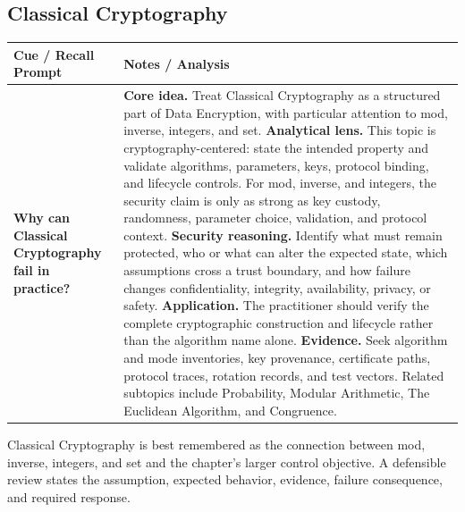 \documentclass[11pt]{article}
\newcommand{\CornellHeader}{%
\rowcolor{Navy}\color{white}\bfseries Cue / Recall Prompt & \color{white}\bfseries Notes / Analysis\\\hline}
\newcommand{\CornellRow}[2]{%
\cellcolor{CueGray}\RaggedRight\textbf{#1} & \RaggedRight #2\\\hline}
\begin{document}
\subsection*{Classical Cryptography}
\begin{longtable}{>{\RaggedRight\arraybackslash}p{}|>{\RaggedRight\arraybackslash}p{}}
\CornellHeader
\CornellRow{Why can Classical Cryptography fail in practice?}{\textbf{Core idea.} Treat Classical Cryptography as a structured part of Data Encryption, with particular attention to mod, inverse, integers, and set. \textbf{Analytical lens.} This topic is cryptography-centered: state the intended property and validate algorithms, parameters, keys, protocol binding, and lifecycle controls. For mod, inverse, and integers, the security claim is only as strong as key custody, randomness, parameter choice, validation, and protocol context. \textbf{Security reasoning.} Identify what must remain protected, who or what can alter the expected state, which assumptions cross a trust boundary, and how failure changes confidentiality, integrity, availability, privacy, or safety. \textbf{Application.} The practitioner should verify the complete cryptographic construction and lifecycle rather than the algorithm name alone. \textbf{Evidence.} Seek algorithm and mode inventories, key provenance, certificate paths, protocol traces, rotation records, and test vectors. Related subtopics include Probability, Modular Arithmetic, The Euclidean Algorithm, and Congruence.}
\end{longtable}
\begin{topicsummary}
Classical Cryptography is best remembered as the connection between mod, inverse, integers, and set and the chapter's larger control objective. A defensible review states the assumption, expected behavior, evidence, failure consequence, and required response.
\end{topicsummary}
\end{document}
